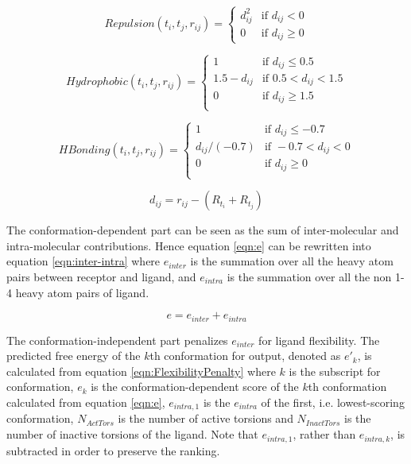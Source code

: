 \begin{equation}
\label{eqn:Repulsion}
Repulsion(t_i, t_j, r_{ij}) =
\begin{cases}
d_{ij}^2 & \text{if } d_{ij} < 0\\
0 &\text{if } d_{ij} \geq 0
\end{cases}
\end{equation}

\begin{equation}
\label{eqn:Hydrophobic}
Hydrophobic(t_i, t_j, r_{ij}) =
\begin{cases}
1 & \text{if } d_{ij} \leq 0.5\\
1.5 - d_{ij} & \text{if } 0.5 < d_{ij} < 1.5\\
0 & \text{if } d_{ij} \geq 1.5\\
\end{cases}
\end{equation}

\begin{equation}
\label{eqn:HBonding}
HBonding(t_i, t_j, r_{ij}) =
\begin{cases}
1 & \text{if } d_{ij} \leq -0.7\\
d_{ij} / (-0.7) & \text{if } -0.7 < d_{ij} < 0\\
0 & \text{if } d_{ij} \geq 0\\
\end{cases}
\end{equation}

\begin{equation}
\label{eqn:dij}
d_{ij} = r_{ij} - (R_{t_i} + R_{t_j})
\end{equation}

The conformation-dependent part can be seen as the sum of inter-molecular and intra-molecular contributions. Hence equation \eqref{eqn:e} can be rewritten into equation \eqref{eqn:inter-intra} where $e_{inter}$ is the summation over all the heavy atom pairs between receptor and ligand, and $e_{intra}$ is the summation over all the non 1-4 heavy atom pairs of ligand.

\begin{equation}
\label{eqn:inter-intra}
e = e_{inter} + e_{intra}
\end{equation}

The conformation-independent part penalizes $e_{inter}$ for ligand flexibility. The predicted free energy of the $k$th conformation for output, denoted as $e'_k$, is calculated from equation \eqref{eqn:FlexibilityPenalty} where $k$ is the subscript for conformation, $e_k$ is the conformation-dependent score of the $k$th conformation calculated from equation \eqref{eqn:e}, $e_{intra,1}$ is the $e_{intra}$ of the first, i.e. lowest-scoring conformation, $N_{ActTors}$ is the number of active torsions and $N_{InactTors}$ is the number of inactive torsions of the ligand. Note that $e_{intra,1}$, rather than $e_{intra,k}$, is subtracted in order to preserve the ranking.

